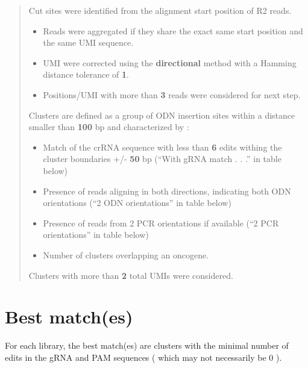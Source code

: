 \documentclass[
]{article}
\begin{document}
\begin{quote}
Cut sites were identified from the alignment start position of R2 reads.

\begin{itemize}
\item
  Reads were aggregated if they share the exact same start position and
  the same UMI sequence.
\item
  UMI were corrected using the \textbf{directional} method with a
  Hamming distance tolerance of \textbf{1}.
\item
  Positions/UMI with more than \textbf{3} reads were considered for next
  step.
\end{itemize}

Clusters are defined as a group of ODN insertion sites within a distance
smaller than \textbf{100} bp and characterized by :

\begin{itemize}
\item
  Match of the crRNA sequence with less than \textbf{6} edits withing
  the cluster boundaries +/- \textbf{50} bp (``With gRNA match . . .''
  in table below)
\item
  Presence of reads aligning in both directions, indicating both ODN
  orientations (``2 ODN orientations'' in table below)
\item
  Presence of reads from 2 PCR orientations if available (``2 PCR
  orientations'' in table below)
\item
  Number of clusters overlapping an oncogene.
\end{itemize}

Clusters with more than \textbf{2} total UMIs were considered.
\end{quote}

\section{Best match(es)}\label{best-matches}

For each library, the best match(es) are clusters with the minimal
number of edits in the gRNA and PAM sequences ( which may not
necessarily be 0 ).

\begin{table}[!h]
\centering\centering
\caption{\label{tab:unnamed-chunk-5}Table 4}
\centering
{}
\end{table}
\end{document}
